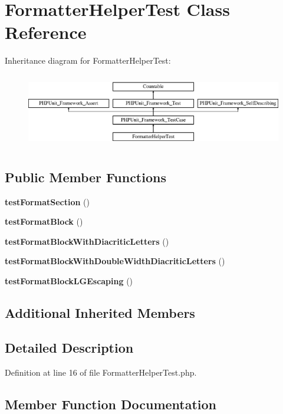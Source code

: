 \section{Formatter\+Helper\+Test Class Reference}
\label{class_symfony_1_1_component_1_1_console_1_1_tests_1_1_helper_1_1_formatter_helper_test}
Inheritance diagram for Formatter\+Helper\+Test\+:\begin{figure}[H]
\begin{center}
\leavevmode
\includegraphics[height=3.303835cm]{class_symfony_1_1_component_1_1_console_1_1_tests_1_1_helper_1_1_formatter_helper_test}
\end{center}
\end{figure}
\subsection*{Public Member Functions}
\begin{DoxyCompactItemize}
\item 
{\bf test\+Format\+Section} ()
\item 
{\bf test\+Format\+Block} ()
\item 
{\bf test\+Format\+Block\+With\+Diacritic\+Letters} ()
\item 
{\bf test\+Format\+Block\+With\+Double\+Width\+Diacritic\+Letters} ()
\item 
{\bf test\+Format\+Block\+L\+G\+Escaping} ()
\end{DoxyCompactItemize}
\subsection*{Additional Inherited Members}


\subsection{Detailed Description}


Definition at line 16 of file Formatter\+Helper\+Test.\+php.



\subsection{Member Function Documentation}
